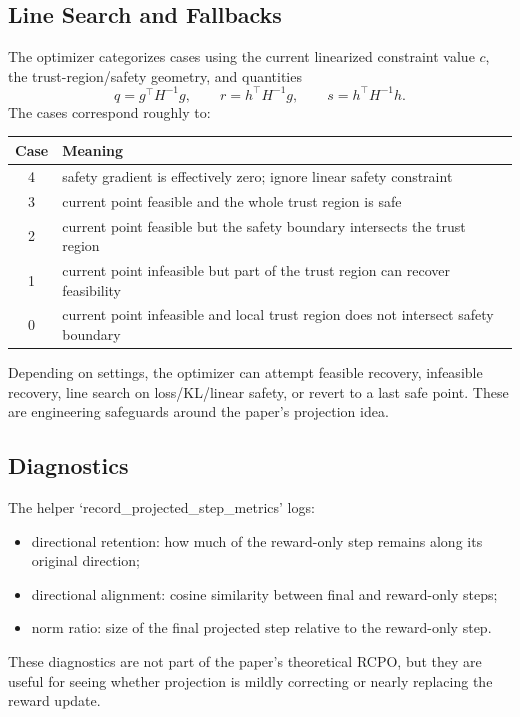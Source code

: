 \documentclass[11pt]{article}
\begin{document}
\subsection{Line Search and Fallbacks}
The optimizer categorizes cases using the current linearized constraint value $c$, the trust-region/safety geometry, and quantities
\begin{equation}
    q=g^\top H^{-1}g,
    \qquad r=h^\top H^{-1}g,
    \qquad s=h^\top H^{-1}h.
\end{equation}
The cases correspond roughly to:
\begin{center}
\begin{tabular}{cl}
\toprule
Case & Meaning \\
\midrule
4 & safety gradient is effectively zero; ignore linear safety constraint \\
3 & current point feasible and the whole trust region is safe \\
2 & current point feasible but the safety boundary intersects the trust region \\
1 & current point infeasible but part of the trust region can recover feasibility \\
0 & current point infeasible and local trust region does not intersect safety boundary \\
\bottomrule
\end{tabular}
\end{center}
Depending on settings, the optimizer can attempt feasible recovery, infeasible recovery, line search on loss/KL/linear safety, or revert to a last safe point.  These are engineering safeguards around the paper's projection idea.

\subsection{Diagnostics}
The helper `record\_projected\_step\_metrics' logs:
\begin{itemize}[leftmargin=2em]
    \item directional retention: how much of the reward-only step remains along its original direction;
    \item directional alignment: cosine similarity between final and reward-only steps;
    \item norm ratio: size of the final projected step relative to the reward-only step.
\end{itemize}
These diagnostics are not part of the paper's theoretical RCPO, but they are useful for seeing whether projection is mildly correcting or nearly replacing the reward update.
\end{document}
